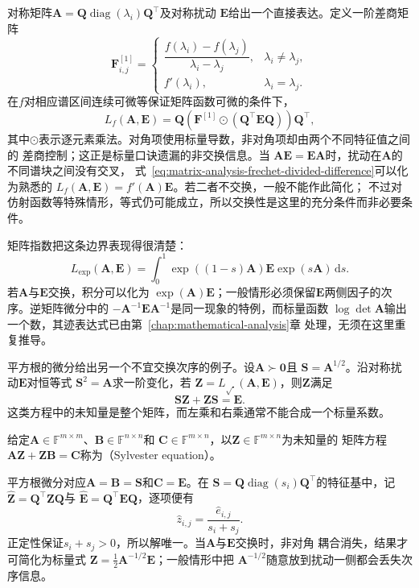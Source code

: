 对称矩阵$\bm{A}=\bm{Q}\operatorname{diag}(\lambda_i)\bm{Q}^{\top}$及对称扰动
$\bm{E}$给出一个直接表达。定义一阶差商矩阵
\[
  \bm{F}^{[1]}_{i,j}
  =
  \begin{cases}
    \dfrac{f(\lambda_i)-f(\lambda_j)}{\lambda_i-\lambda_j},
      &\lambda_i\neq\lambda_j,\\[6pt]
    f'(\lambda_i),&\lambda_i=\lambda_j.
  \end{cases}
\]
在$f$对相应谱区间连续可微等保证矩阵函数可微的条件下，
\begin{equation}
  L_f(\bm{A},\bm{E})
  =
  \bm{Q}\left(
    \bm{F}^{[1]}\mathbin{\odot}
    (\bm{Q}^{\top}\bm{E}\bm{Q})
  \right)\bm{Q}^{\top},
  \label{eq:matrix-analysis-frechet-divided-difference}
\end{equation}
其中$\odot$表示逐元素乘法。对角项使用标量导数，非对角项却由两个不同特征值之间的
差商控制；这正是标量口诀遗漏的非交换信息。当
$\bm{A}\bm{E}=\bm{E}\bm{A}$时，扰动在$\bm{A}$的不同谱块之间没有交叉，
式~\eqref{eq:matrix-analysis-frechet-divided-difference}可以化为熟悉的
$L_f(\bm{A},\bm{E})=f'(\bm{A})\bm{E}$。若二者不交换，一般不能作此简化；
不过对仿射函数等特殊情形，等式仍可能成立，所以交换性是这里的充分条件而非必要条件。

矩阵指数把这条边界表现得很清楚：
\begin{equation}
  L_{\exp}(\bm{A},\bm{E})
  =
  \int_0^1
  \exp((1-s)\bm{A})\bm{E}\exp(s\bm{A})\,\mathrm{d}s.
  \label{eq:matrix-analysis-exponential-frechet-derivative}
\end{equation}
若$\bm{A}$与$\bm{E}$交换，积分可以化为
$\exp(\bm{A})\bm{E}$；一般情形必须保留$\bm{E}$两侧因子的次序。逆矩阵微分中的
$-\bm{A}^{-1}\bm{E}\bm{A}^{-1}$是同一现象的特例，而标量函数
$\log\det\bm{A}$输出一个数，其迹表达式已由第~\ref{chap:mathematical-analysis}章
处理，无须在这里重复推导。

平方根的微分给出另一个不宜交换次序的例子。设$\bm{A}\succ\bm{0}$且
$\bm{S}=\bm{A}^{1/2}$。沿对称扰动$\bm{E}$对恒等式
$\bm{S}^2=\bm{A}$求一阶变化，若
$\bm{Z}=L_{\sqrt{\cdot}}(\bm{A},\bm{E})$，则$\bm{Z}$满足
\[
  \bm{S}\bm{Z}+\bm{Z}\bm{S}=\bm{E}.
\]
这类方程中的未知量是整个矩阵，而左乘和右乘通常不能合成一个标量系数。
\begin{definition}[Sylvester方程]
\label{def:matrix-analysis-sylvester-equation}
给定$\bm A\in\mathbb F^{m\times m}$、$\bm B\in\mathbb F^{n\times n}$和
$\bm C\in\mathbb F^{m\times n}$，以$\bm Z\in\mathbb F^{m\times n}$为未知量的
矩阵方程$\bm A\bm Z+\bm Z\bm B=\bm C$称为（Sylvester equation）。
\end{definition}
平方根微分对应$\bm A=\bm B=\bm S$和$\bm C=\bm E$。在
$\bm{S}=\bm{Q}\operatorname{diag}(s_i)\bm{Q}^{\top}$的特征基中，记
$\widehat{\bm{Z}}=\bm{Q}^{\top}\bm{Z}\bm{Q}$与
$\widehat{\bm{E}}=\bm{Q}^{\top}\bm{E}\bm{Q}$，逐项便有
\[
  \widehat{z}_{i,j}
  =\frac{\widehat{e}_{i,j}}{s_i+s_j}.
\]
正定性保证$s_i+s_j>0$，所以解唯一。当$\bm{A}$与$\bm{E}$交换时，非对角
耦合消失，结果才可简化为标量式
$\bm{Z}=\tfrac12\bm{A}^{-1/2}\bm{E}$；一般情形中把
$\bm{A}^{-1/2}$随意放到扰动一侧都会丢失次序信息。

